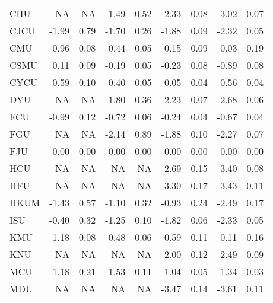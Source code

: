 \begin{longtable}[t]{lrrrrrrrr}
\hspace{1em}CHU & NA & NA & -1.49 & 0.52 & -2.33 & 0.08 & -3.02 & 0.07\\
\hspace{1em}CJCU & -1.99 & 0.79 & -1.70 & 0.26 & -1.88 & 0.09 & -2.32 & 0.05\\
\hspace{1em}CMU & 0.96 & 0.08 & 0.44 & 0.05 & 0.15 & 0.09 & 0.03 & 0.19\\
\hspace{1em}CSMU & 0.11 & 0.09 & -0.19 & 0.05 & -0.23 & 0.08 & -0.89 & 0.08\\
\hspace{1em}CYCU & -0.59 & 0.10 & -0.40 & 0.05 & 0.05 & 0.04 & -0.56 & 0.04\\
\hspace{1em}DYU & NA & NA & -1.80 & 0.36 & -2.23 & 0.07 & -2.68 & 0.06\\
\hspace{1em}FCU & -0.99 & 0.12 & -0.72 & 0.06 & -0.24 & 0.04 & -0.67 & 0.04\\
\hspace{1em}FGU & NA & NA & -2.14 & 0.89 & -1.88 & 0.10 & -2.27 & 0.07\\
\hspace{1em}FJU & 0.00 & 0.00 & 0.00 & 0.00 & 0.00 & 0.00 & 0.00 & 0.00\\
\hspace{1em}HCU & NA & NA & NA & NA & -2.69 & 0.15 & -3.40 & 0.08\\
\hspace{1em}HFU & NA & NA & NA & NA & -3.30 & 0.17 & -3.43 & 0.11\\
\hspace{1em}HKUM & -1.43 & 0.57 & -1.10 & 0.32 & -0.93 & 0.24 & -2.49 & 0.17\\
\hspace{1em}ISU & -0.40 & 0.32 & -1.25 & 0.10 & -1.82 & 0.06 & -2.33 & 0.05\\
\hspace{1em}KMU & 1.18 & 0.08 & 0.48 & 0.06 & 0.59 & 0.11 & 0.11 & 0.16\\
\hspace{1em}KNU & NA & NA & NA & NA & -2.00 & 0.12 & -2.49 & 0.09\\
\hspace{1em}MCU & -1.18 & 0.21 & -1.53 & 0.11 & -1.04 & 0.05 & -1.34 & 0.03\\
\hspace{1em}MDU & NA & NA & NA & NA & -3.47 & 0.14 & -3.61 & 0.11\\

\end{longtable}
